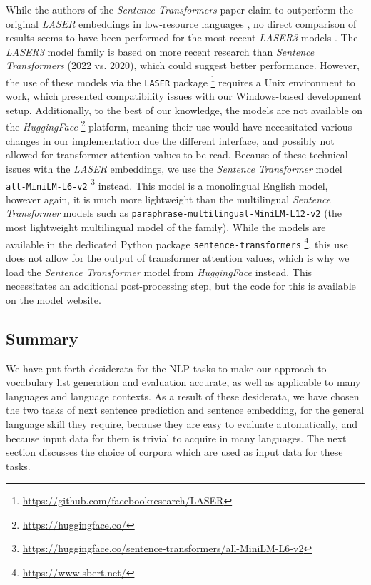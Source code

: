 While the authors of the \textit{Sentence Transformers} paper claim to outperform the original \textit{LASER} embeddings in low-resource languages \cite{reimersMakingMonolingualSentence2020}, no direct comparison of results seems to have been performed for the most recent \textit{LASER3} models \cite{heffernanBitextMiningUsing2022}.
The \textit{LASER3} model family is based on more recent research than \textit{Sentence Transformers} (2022 vs. 2020), which could suggest better performance.
However, the use of these models via the \texttt{LASER} package \footnote{\url{https://github.com/facebookresearch/LASER}} requires a Unix environment to work, which presented compatibility issues with our Windows-based development setup.
Additionally, to the best of our knowledge, the models are not available on the \textit{HuggingFace} \footnote{\url{https://huggingface.co/}} platform, meaning their use would have necessitated various changes in our implementation due the different interface, and possibly not allowed for transformer attention values to be read.
Because of these technical issues with the \textit{LASER} embeddings, we use the \textit{Sentence Transformer} model \texttt{all-MiniLM-L6-v2} \footnote{\url{https://huggingface.co/sentence-transformers/all-MiniLM-L6-v2}} instead.
This model is a monolingual English model, however again, it is much more lightweight than the multilingual \textit{Sentence Transformer} models such as \texttt{paraphrase-multilingual-MiniLM-L12-v2} (the most lightweight multilingual model of the family).
While the models are available in the dedicated Python package \texttt{sentence-transformers} \footnote{\url{https://www.sbert.net/}}, this use does not allow for the output of transformer attention values, which is why we load the \textit{Sentence Transformer} model from \textit{HuggingFace} instead.
This necessitates an additional post-processing step, but the code for this is available on the model website.

\subsection{Summary}
We have put forth desiderata for the NLP tasks to make our approach to vocabulary list generation and evaluation accurate, as well as applicable to many languages and language contexts.
As a result of these desiderata, we have chosen the two tasks of next sentence prediction and sentence embedding, for the general language skill they require, because they are easy to evaluate automatically, and because input data for them is trivial to acquire in many languages.
The next section discusses the choice of corpora which are used as input data for these tasks.


